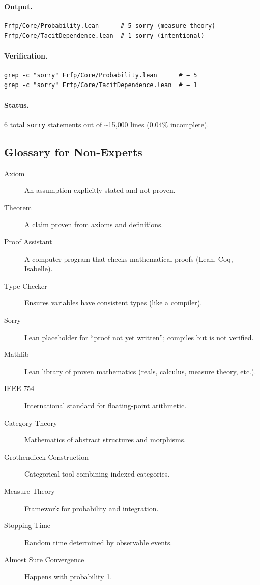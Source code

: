 \paragraph{Output.}
\begin{verbatim}
Frfp/Core/Probability.lean      # 5 sorry (measure theory)
Frfp/Core/TacitDependence.lean  # 1 sorry (intentional)
\end{verbatim}

\paragraph{Verification.}
\begin{verbatim}
grep -c "sorry" Frfp/Core/Probability.lean      # → 5
grep -c "sorry" Frfp/Core/TacitDependence.lean  # → 1
\end{verbatim}

\paragraph{Status.}
6 total \texttt{sorry} statements out of \textasciitilde 15{,}000 lines (0.04\% incomplete).

\subsection{Glossary for Non-Experts}

\begin{description}
  \item[Axiom] An assumption explicitly stated and not proven.
  \item[Theorem] A claim proven from axioms and definitions.
  \item[Proof Assistant] A computer program that checks mathematical proofs (Lean, Coq, Isabelle).
  \item[Type Checker] Ensures variables have consistent types (like a compiler).
  \item[Sorry] Lean placeholder for ``proof not yet written''; compiles but is not verified.
  \item[Mathlib] Lean library of proven mathematics (reals, calculus, measure theory, etc.).
  \item[IEEE 754] International standard for floating-point arithmetic.
  \item[Category Theory] Mathematics of abstract structures and morphisms.
  \item[Grothendieck Construction] Categorical tool combining indexed categories.
  \item[Measure Theory] Framework for probability and integration.
  \item[Stopping Time] Random time determined by observable events.
  \item[Almost Sure Convergence] Happens with probability 1.
\end{description}

